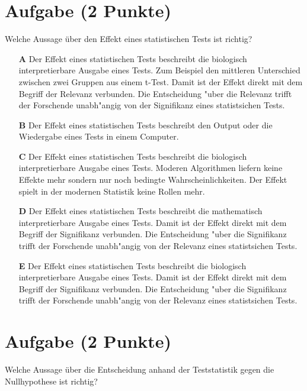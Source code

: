 \documentclass[a4paper, 9pt]{scrartcl}\usepackage[]{graphicx}\usepackage[]{xcolor}
\begin{document}
\section{Aufgabe \hfill (2 Punkte)}

Welche Aussage {\"u}ber den Effekt eines statistischen Tests ist richtig?



\begin{enumerate}
\item [\textbf{A} \msquare] Der Effekt eines statistischen Tests beschreibt die biologisch interpretierbare Ausgabe eines Tests. Zum Beispiel den mittleren Unterschied zwischen zwei Gruppen aus einem t-Test. Damit ist der Effekt direkt mit dem Begriff der Relevanz verbunden. Die Entscheidung {"u}ber die Relevanz trifft der Forschende unabh{"a}ngig von der Signifikanz eines statistsichen Tests.
\item [\textbf{B} \msquare] Der Effekt eines statistischen Tests beschreibt den Output oder die Wiedergabe eines Tests in einem Computer.
\item [\textbf{C} \msquare] Der Effekt eines statistischen Tests beschreibt die biologisch interpretierbare Ausgabe eines Tests. Moderen Algorithmen liefern keine Effekte mehr sondern nur noch bedingte Wahrscheinlichkeiten. Der Effekt spielt in der modernen Statistik keine Rollen mehr.
\item [\textbf{D} \msquare] Der Effekt eines statistischen Tests beschreibt die mathematisch interpretierbare Ausgabe eines Tests. Damit ist der Effekt direkt mit dem Begriff der Signifikanz verbunden. Die Entscheidung {"u}ber die Signifikanz trifft der Forschende unabh{"a}ngig von der Relevanz eines statistsichen Tests.
\item [\textbf{E} \msquare] Der Effekt eines statistischen Tests beschreibt die biologisch interpretierbare Ausgabe eines Tests. Damit ist der Effekt direkt mit dem Begriff der Signifikanz verbunden. Die Entscheidung {"u}ber die Signifikanz trifft der Forschende unabh{"a}ngig von der Relevanz eines statistsichen Tests.
\end{enumerate}

\section{Aufgabe \hfill (2 Punkte)}



Welche Aussage {\"u}ber die Entscheidung anhand der Teststatistik gegen die
Nullhypothese ist richtig?
\end{document}
